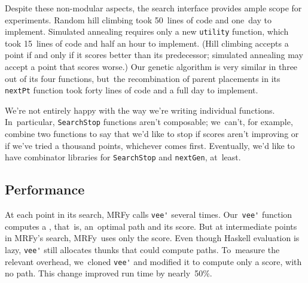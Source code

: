 \documentclass[preprint,nonatbib,blockstyle,times]{sigplanconf}
\newcommand\mrfy{MRFy} %
\newcommand\seclabel[1]{\label{sec:#1}}
\begin{document}
Despite these non-modular aspects, the search
interface provides ample scope for
experiments.
Random hill climbing took 50~lines of code and one~day to
implement.  
Simulated annealing requires only a new
\texttt{utility} function, which took 15~lines of code and half an hour to implement.
(Hill climbing accepts a point if and only if it scores better than its
predecessor;
simulated annealing may accept a point that scores worse.)
Our genetic algorithm is very similar in three out of its four
functions,
but~the recombination of parent
placements in its \texttt{nextPt} function took forty lines of code
and a full day to implement.

We're not entirely happy with the way we're writing individual
functions.
In~particular, \texttt{SearchStop} functions aren't composable;
we~can't, for example, combine two functions to say that we'd like to
stop if scores aren't improving or if we've tried a thousand points,
whichever comes first.
Eventually, we'd like to have
combinator libraries for \texttt{SearchStop} and \texttt{nextGen}, at~least.



\subsection{Performance}

\seclabel{perf}
\seclabel{performance}

At each point in its search,
MRFy calls \verb+vee'+ several
 times.
Our~\verb+vee'+
function computes a \mbox{}, that~is, 
an~optimal path and its score.
But at intermediate points in \mrfy's search,
\mrfy\ uses only the
score.
Even though Haskell evaluation is lazy, \verb+vee'+ 
still allocates thunks that could compute paths.
To~measure the relevant overhead,
we~cloned \verb+vee'+ and modified it to compute
only a score, with no path.
This change improved 
run time by nearly~50\%.
\end{document}
